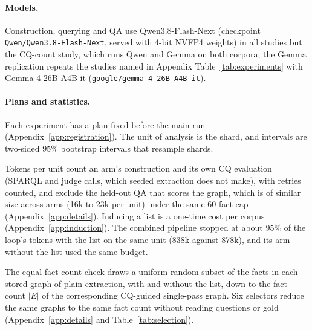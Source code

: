 \paragraph{Models.}
Construction, querying and QA use Qwen3.8-Flash-Next (checkpoint \texttt{Qwen/Qwen3.8-Flash-Next}, served with 4-bit NVFP4 weights) in all studies but the CQ-count study, which runs Qwen and Gemma on both corpora; the Gemma replication repeats the studies named in Appendix Table~\ref{tab:experiments} with Gemma-4-26B-A4B-it (\texttt{google/gemma-4-26B-A4B-it}).

\paragraph{Plans and statistics.}
Each experiment has a plan fixed before the main run (Appendix~\ref{app:registration}). The unit of analysis is the shard, and intervals are two-sided 95\% bootstrap intervals that resample shards.

Tokens per unit count an arm's construction and its own CQ evaluation (SPARQL and judge calls, which seeded extraction does not make), with retries counted, and exclude the held-out QA that scores the graph, which is of similar size across arms (16k to 23k per unit) under the same 60-fact cap (Appendix~\ref{app:details}). Inducing a list is a one-time cost per corpus (Appendix~\ref{app:induction}). The combined pipeline stopped at about 95\% of the loop's tokens with the list on the same unit (838k against 878k), and its arm without the list used the same budget.

The equal-fact-count check draws a uniform random subset of the facts in each stored graph of plain extraction, with and without the list, down to the fact count $|E|$ of the corresponding CQ-guided single-pass graph. Six selectors reduce the same graphs to the same fact count without reading questions or gold (Appendix~\ref{app:details} and Table~\ref{tab:selection}).
